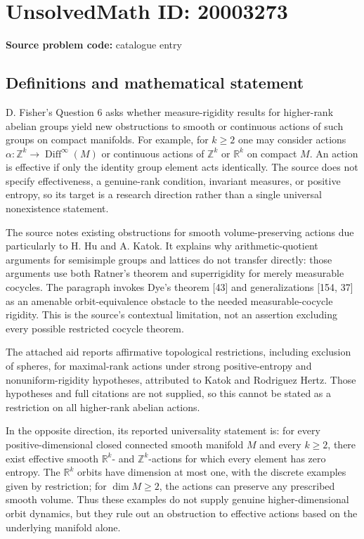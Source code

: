 \documentclass[11pt]{article}
\newcommand{\Z}{\mathbb{Z}}
\newcommand{\R}{\mathbb{R}}
\begin{document}
\section*{UnsolvedMath ID: 20003273}
\textbf{Source problem code:} catalogue entry
\subsection{Definitions and mathematical statement}
D. Fisher's Question 6 asks whether measure-rigidity results for higher-rank abelian groups yield new obstructions to smooth or continuous actions of such groups on compact manifolds. For example, for $k\ge2$ one may consider actions $\alpha:\Z^k\to\operatorname{Diff}^\infty(M)$ or continuous actions of $\Z^k$ or $\R^k$ on compact $M$. An action is effective if only the identity group element acts identically. The source does not specify effectiveness, a genuine-rank condition, invariant measures, or positive entropy, so its target is a research direction rather than a single universal nonexistence statement.

The source notes existing obstructions for smooth volume-preserving actions due particularly to H. Hu and A. Katok. It explains why arithmetic-quotient arguments for semisimple groups and lattices do not transfer directly: those arguments use both Ratner's theorem and superrigidity for merely measurable cocycles. The paragraph invokes Dye's theorem [43] and generalizations [154, 37] as an amenable orbit-equivalence obstacle to the needed measurable-cocycle rigidity. This is the source's contextual limitation, not an assertion excluding every possible restricted cocycle theorem.

The attached aid reports affirmative topological restrictions, including exclusion of spheres, for maximal-rank actions under strong positive-entropy and nonuniform-rigidity hypotheses, attributed to Katok and Rodriguez Hertz. Those hypotheses and full citations are not supplied, so this cannot be stated as a restriction on all higher-rank abelian actions.

In the opposite direction, its reported universality statement is: for every positive-dimensional closed connected smooth manifold $M$ and every $k\ge2$, there exist effective smooth $\R^k$- and $\Z^k$-actions for which every element has zero entropy. The $\R^k$ orbits have dimension at most one, with the discrete examples given by restriction; for $\dim M\ge2$, the actions can preserve any prescribed smooth volume. Thus these examples do not supply genuine higher-dimensional orbit dynamics, but they rule out an obstruction to effective actions based on the underlying manifold alone.
\end{document}
